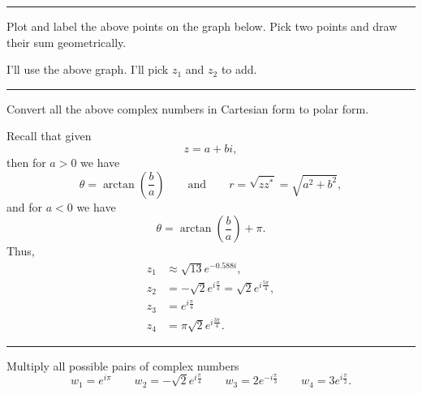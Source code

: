 \documentclass[12pt]{article} %
\begin{document}
\hrule

\begin{problem}
Plot and label the above points on the graph below. Pick two points and draw their sum geometrically. 
        \begin{center}
        \end{center}
\end{problem}

\begin{solution}
I'll use the above graph. I'll pick $z_1$ and $z_2$ to add.
\end{solution}
\hrule

\begin{problem}
Convert all the above complex numbers in Cartesian form to polar form.
\end{problem}

\begin{solution}
Recall that given
\[
z=a+bi,
\]
then for $a>0$ we have
\[
\theta = \arctan\left(\frac{b}{a}\right) \qquad \textrm{and} \qquad r = \sqrt{zz^*}=\sqrt{a^2+b^2},
\]
and for $a<0$ we have
\[
\theta = \arctan\left(\frac{b}{a}\right) + \pi.
\]
Thus, 
\begin{align*}
z_1 &\approx  \sqrt{13}e^{-0.588i},\\
z_2 &= -\sqrt{2}e^{i\frac{\pi}{4}}=\sqrt{2}e^{i\frac{5\pi}{4}},\\
z_3 &= e^{i\frac{\pi}{4}}\\
z_4 &= \pi \sqrt{2}e^{i\frac{3\pi}{4}}.
\end{align*}
\end{solution}

\hrule

\begin{problem}
Multiply all possible pairs of complex numbers
\[
w_1 = e^{i\pi} \qquad w_2 = -\sqrt{2} e^{i\frac{\pi}{4}} \qquad w_3 = 2 e^{-i\frac{\pi}{3}} \qquad w_4= 3 e^{i\frac{\pi}{2}}.
\]
\end{problem}
\end{document}
